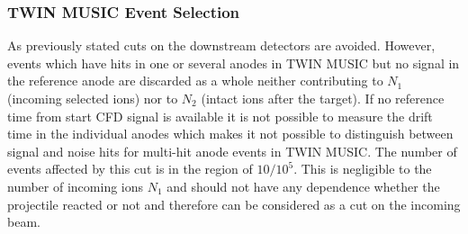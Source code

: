 \subsubsection{TWIN MUSIC Event Selection}
As previously stated cuts on the downstream detectors are avoided. However, events which have hits in one or several anodes in TWIN MUSIC but no signal in the reference anode are discarded as a whole neither contributing to $N_1$ (incoming selected ions) nor to $N_2$ (intact ions after the target). If no reference time from start CFD signal is available it is not possible to measure the drift time in the individual anodes which makes it not possible to distinguish between signal and noise hits for multi-hit anode events in TWIN MUSIC. The number of events affected by this cut is in the region of $10/10^5$. This is negligible to the number of incoming ions $N_1$ and should not have any dependence whether the projectile reacted or not and therefore can be considered as a cut on the incoming beam.
